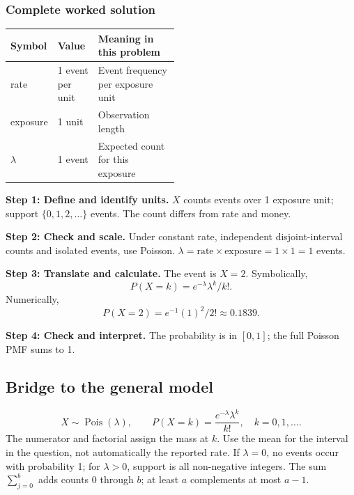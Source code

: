 \subsubsection*{Complete worked solution}
\begin{center}
\begin{tabular}{llp{0.48\linewidth}}
\toprule
Symbol & Value & Meaning in this problem \\ \midrule
rate & 1 event per unit & Event frequency per exposure unit \\
exposure & 1 unit & Observation length \\
$\lambda$ & 1 event & Expected count for this exposure \\
\bottomrule
\end{tabular}
\end{center}

\par\noindent\begin{minipage}{\linewidth}
\textbf{Step 1: Define and identify units.} $X$ counts events over 1 exposure unit; support $\{0,1,2,\ldots\}$ events. The count differs from rate and money.
\end{minipage}\par\medskip
\par\noindent\begin{minipage}{\linewidth}
\textbf{Step 2: Check and scale.} Under constant rate, independent disjoint-interval counts and isolated events, use Poisson. $\lambda=\text{rate}\times\text{exposure}=1\times1=1$ events.
\end{minipage}\par\medskip
\par\noindent\begin{minipage}{\linewidth}
\textbf{Step 3: Translate and calculate.} The event is $ X=2$. Symbolically,
\[P(X=k)=e^{-\lambda}\lambda^k/k!.\]
Numerically,
\[P(X=2)=e^{-1}(1)^2/2!\approx 0.1839.\]
\end{minipage}\par\medskip
\par\noindent\begin{minipage}{\linewidth}
\textbf{Step 4: Check and interpret.} The probability is in $[0,1]$; the full Poisson PMF sums to 1. 
\end{minipage}\par\medskip
\subsection{Bridge to the general model}
\[X\sim\operatorname{Pois}(\lambda),\qquad P(X=k)=\frac{e^{-\lambda}\lambda^k}{k!},\quad k=0,1,\ldots.\]
The numerator and factorial assign the mass at $k$. Use the mean for the interval in the question, not automatically the reported rate. If $\lambda=0$, no events occur with probability 1; for $\lambda>0$, support is all non-negative integers. The sum $\sum_{j=0}^{b}$ adds counts 0 through $b$; at least $a$ complements at most $a-1$.
